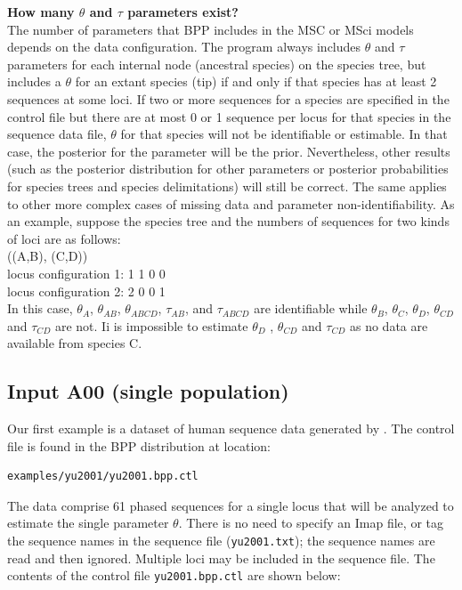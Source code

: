\documentclass[a4paper]{book}
\numberwithin{equation}{section} \renewcommand{\baselinestretch}{0.55}
\begin{document}
\begin{mdframed}
  \textbf{How many $\theta$ and $\tau$ parameters exist?} \\
  The number of parameters that \textsc{BPP} includes in the MSC or
  MSci models depends on the data configuration. The program always
  includes $\theta$ and $\tau$ parameters for each internal node
  (ancestral species) on the species tree, but includes a $\theta$ for
  an extant species (tip) if and only if that species has at least 2
  sequences at some loci.  If two or more sequences for a species are
  specified in the control file but there are at most 0 or 1 sequence
  per locus for that species in the sequence data file, $\theta$ for
  that species will not be identifiable or estimable.  In that case,
  the posterior for the parameter will be the prior.  Nevertheless,
  other results (such as the posterior distribution for other
  parameters or posterior probabilities for species trees and species
  delimitations) will still be correct.  The same applies to other
  more complex cases of missing data and parameter non-identifiability.
  As an example, suppose the species tree and the numbers of sequences
  for two kinds of loci are as follows: \\
  ((A,B), (C,D)) \\
  locus configuration 1:  1 1 0 0 \\
  locus configuration 2:  2 0 0 1 \\
  In this case, $\theta_A$, $\theta_{AB}$, $\theta_{ABCD}$,
  $\tau_{AB}$, and $\tau_{ABCD}$ are identifiable while $\theta_B$,
  $\theta_C$, $\theta_D$, $\theta_{CD}$ and $\tau_{CD}$ are not.  Ii
  is impossible to estimate $\theta_D$ , $\theta_{CD}$ and $\tau_{CD}$
  as no data are available from species C.
\end{mdframed}

\subsection{Input A00 (single population)}
Our first example is a dataset of human sequence data generated by
\citet{Yu2001}. The control file is found in the BPP distribution at
location:
\begin{verbatim}
examples/yu2001/yu2001.bpp.ctl
\end{verbatim}
The data comprise 61 phased sequences for a single locus that will be
analyzed to estimate the single parameter $\theta$.  There is no need
to specify an Imap file, or tag the sequence names in the sequence
file (\texttt{yu2001.txt}); the sequence names are read and then
ignored.  Multiple loci may be included in the sequence file. The
contents of the control file \texttt{yu2001.bpp.ctl} are shown below:
\end{document}
